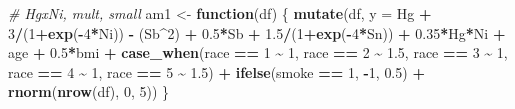 \documentclass[12pt, twoside]{amherstthesis}
\newenvironment{Shaded}{\begin{snugshade}}{\end{snugshade}}
\newcommand{\AttributeTok}[1]{\textcolor[rgb]{0.13,0.29,0.53}{#1}}
\newcommand{\CommentTok}[1]{\textcolor[rgb]{0.56,0.35,0.01}{\textit{#1}}}
\newcommand{\ControlFlowTok}[1]{\textcolor[rgb]{0.13,0.29,0.53}{\textbf{#1}}}
\newcommand{\DecValTok}[1]{\textcolor[rgb]{0.00,0.00,0.81}{#1}}
\newcommand{\FloatTok}[1]{\textcolor[rgb]{0.00,0.00,0.81}{#1}}
\newcommand{\FunctionTok}[1]{\textcolor[rgb]{0.13,0.29,0.53}{\textbf{#1}}}
\newcommand{\NormalTok}[1]{#1}
\newcommand{\OtherTok}[1]{\textcolor[rgb]{0.56,0.35,0.01}{#1}}
\newcommand{\SpecialCharTok}[1]{\textcolor[rgb]{0.81,0.36,0.00}{\textbf{#1}}}
\begin{document}
\begin{Shaded}
\begin{Highlighting}[]
\CommentTok{\# HgxNi, mult, small}
\NormalTok{am1 }\OtherTok{\textless{}{-}} \ControlFlowTok{function}\NormalTok{(df) \{}
  \FunctionTok{mutate}\NormalTok{(df, }\AttributeTok{y =} 
\NormalTok{           Hg }\SpecialCharTok{+} \DecValTok{3}\SpecialCharTok{/}\NormalTok{(}\DecValTok{1}\SpecialCharTok{+}\FunctionTok{exp}\NormalTok{(}\SpecialCharTok{{-}}\DecValTok{4}\SpecialCharTok{*}\NormalTok{Ni)) }\SpecialCharTok{{-}}\NormalTok{ (Sb}\SpecialCharTok{\^{}}\DecValTok{2}\NormalTok{) }\SpecialCharTok{+} \FloatTok{0.5}\SpecialCharTok{*}\NormalTok{Sb }\SpecialCharTok{+} \FloatTok{1.5}\SpecialCharTok{/}\NormalTok{(}\DecValTok{1}\SpecialCharTok{+}\FunctionTok{exp}\NormalTok{(}\SpecialCharTok{{-}}\DecValTok{4}\SpecialCharTok{*}\NormalTok{Sn)) }\SpecialCharTok{+} 
           \FloatTok{0.35}\SpecialCharTok{*}\NormalTok{Hg}\SpecialCharTok{*}\NormalTok{Ni }\SpecialCharTok{+} 
\NormalTok{           age }\SpecialCharTok{+} \FloatTok{0.5}\SpecialCharTok{*}\NormalTok{bmi }\SpecialCharTok{+} 
           \FunctionTok{case\_when}\NormalTok{(race }\SpecialCharTok{==} \DecValTok{1} \SpecialCharTok{\textasciitilde{}} \DecValTok{1}\NormalTok{, }
\NormalTok{                     race }\SpecialCharTok{==} \DecValTok{2} \SpecialCharTok{\textasciitilde{}} \FloatTok{1.5}\NormalTok{, }
\NormalTok{                     race }\SpecialCharTok{==} \DecValTok{3} \SpecialCharTok{\textasciitilde{}} \DecValTok{1}\NormalTok{, }
\NormalTok{                     race }\SpecialCharTok{==} \DecValTok{4} \SpecialCharTok{\textasciitilde{}} \DecValTok{1}\NormalTok{, }
\NormalTok{                     race }\SpecialCharTok{==} \DecValTok{5} \SpecialCharTok{\textasciitilde{}} \FloatTok{1.5}\NormalTok{) }\SpecialCharTok{+}
           \FunctionTok{ifelse}\NormalTok{(smoke }\SpecialCharTok{==} \DecValTok{1}\NormalTok{, }\SpecialCharTok{{-}}\DecValTok{1}\NormalTok{, }\FloatTok{0.5}\NormalTok{) }\SpecialCharTok{+}
           \FunctionTok{rnorm}\NormalTok{(}\FunctionTok{nrow}\NormalTok{(df), }\DecValTok{0}\NormalTok{, }\DecValTok{5}\NormalTok{))}
\NormalTok{\}}


\end{Highlighting}
\end{Shaded}
\end{document}
